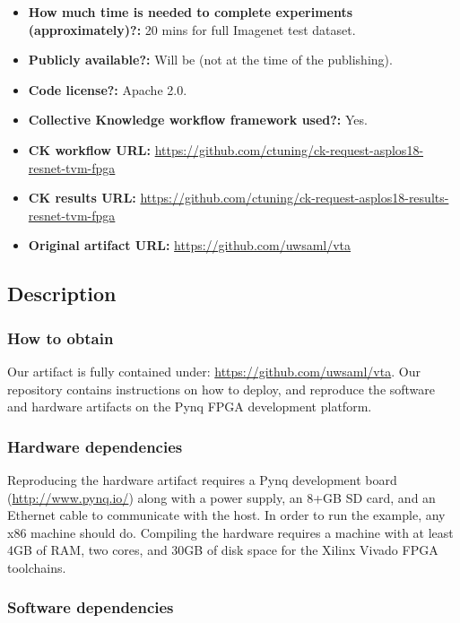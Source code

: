 \documentclass[sigconf]{acmart}
\begin{document}
\begin{itemize}
  \item {\bf How much time is needed to complete experiments (approximately)?:} 20 mins for full Imagenet test dataset.
  \item {\bf Publicly available?:} Will be (not at the time of the publishing).
  \item {\bf Code license?:} Apache 2.0.
  \item {\bf Collective Knowledge workflow framework used?:} Yes.
  \item {\bf CK workflow URL:} \url{https://github.com/ctuning/ck-request-asplos18-resnet-tvm-fpga}
  \item {\bf CK results URL:} \url{https://github.com/ctuning/ck-request-asplos18-results-resnet-tvm-fpga}
  \item {\bf Original artifact URL:} \url{https://github.com/uwsaml/vta}
\end{itemize}

\subsection{Description}

\subsubsection{How to obtain}

Our artifact is fully contained under: \url{https://github.com/uwsaml/vta}.
Our repository contains instructions on how to deploy, and reproduce the software and hardware artifacts on the Pynq FPGA development platform.

\subsubsection{Hardware dependencies}

Reproducing the hardware artifact requires a Pynq development board (\url{http://www.pynq.io/}) along with a power supply, an 8+GB SD card, and an Ethernet cable to communicate with the host.
In order to run the example, any x86 machine should do.
Compiling the hardware requires a machine with at least 4GB of RAM, two cores, and 30GB of disk space for the Xilinx Vivado FPGA toolchains.

\subsubsection{Software dependencies}
\end{document}
